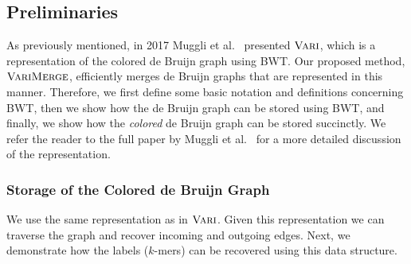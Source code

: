 \subsection{Preliminaries}
\label{prel:vari}

As previously mentioned, in 2017 Muggli et al.~\cite{vari} presented $\mbox{\rm {\sc Vari}}$, which is a representation of the colored de Bruijn graph using BWT.  Our proposed method, $\mbox{\rm {\sc VariMerge}}$, efficiently merges de Bruijn graphs that are represented in this manner. Therefore, we first define some basic notation and definitions concerning BWT, then we show how the de Bruijn graph can be stored using BWT, and finally, we show how the {\em colored} de Bruijn graph can be stored succinctly.  We refer the reader to the full paper by Muggli et al.~\cite{vari} for a more detailed discussion of the representation.











\subsubsection{Storage of the Colored de Bruijn Graph}

We use the same representation as in $\mbox{\rm {\sc Vari}}$.
Given this representation we can traverse the graph and recover incoming and outgoing edges.   Next, we demonstrate how the labels ($k$-mers) can be recovered using this data structure.





